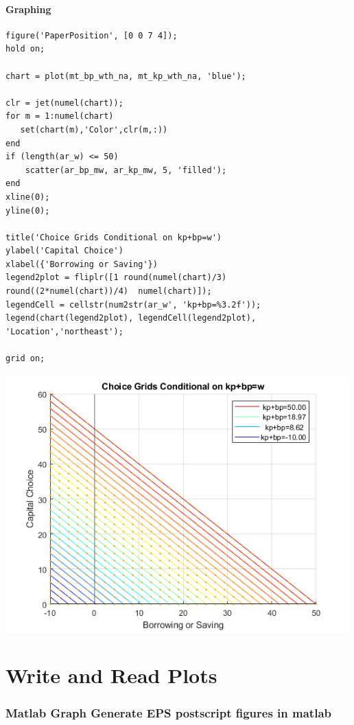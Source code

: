 \documentclass[
]{book}
\begin{document}
\hypertarget{graphing}{%
\paragraph{Graphing}\label{graphing}}

\begin{verbatim}
figure('PaperPosition', [0 0 7 4]);
hold on;

chart = plot(mt_bp_wth_na, mt_kp_wth_na, 'blue');

clr = jet(numel(chart));
for m = 1:numel(chart)
   set(chart(m),'Color',clr(m,:))
end
if (length(ar_w) <= 50) 
    scatter(ar_bp_mw, ar_kp_mw, 5, 'filled');
end
xline(0);
yline(0);

title('Choice Grids Conditional on kp+bp=w')
ylabel('Capital Choice')
xlabel({'Borrowing or Saving'})
legend2plot = fliplr([1 round(numel(chart)/3) round((2*numel(chart))/4)  numel(chart)]);
legendCell = cellstr(num2str(ar_w', 'kp+bp=%3.2f'));
legend(chart(legend2plot), legendCell(legend2plot), 'Location','northeast');

grid on;
\end{verbatim}

\includegraphics[width=5.20833in,height=\textheight]{img/fs_specline_images/figure_0.png}

\hypertarget{write-and-read-plots}{%
\section{Write and Read Plots}\label{write-and-read-plots}}

\hypertarget{matlab-graph-generate-eps-postscript-figures-in-matlab}{%
\subsubsection{Matlab Graph Generate EPS postscript figures in matlab}\label{matlab-graph-generate-eps-postscript-figures-in-matlab}}
\end{document}
